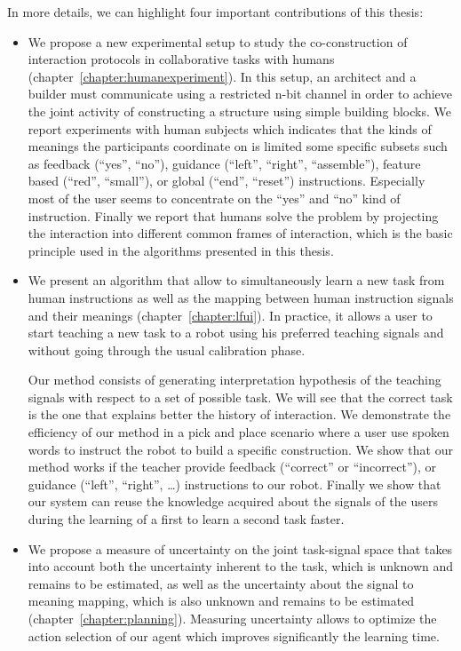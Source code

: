 In more details, we can highlight four important contributions of this thesis:

\begin{itemize}

\item We propose a new experimental setup to study the co-construction of interaction protocols in collaborative tasks with humans \cite{vollmer2014studying} (chapter~\ref{chapter:humanexperiment}). In this setup, an architect and a builder must communicate using a restricted n-bit channel in order to achieve the joint activity of constructing a structure using simple building blocks. We report experiments with human subjects which indicates that the kinds of meanings the participants coordinate on is limited some specific subsets such as feedback (``yes'', ``no''), guidance (``left'', ``right'', ``assemble''), feature based (``red'', ``small''), or global (``end'', ``reset'') instructions. Especially most of the user seems to concentrate on the ``yes'' and ``no'' kind of instruction. Finally we report that humans solve the problem by projecting the interaction into different common frames of
interaction, which is the basic principle used in the algorithms presented in this thesis.

\item  We present an algorithm that allow to simultaneously learn a new task from human instructions as well as the mapping between human instruction signals and their meanings \cite{grizou2013interactive,grizou2013robot,grizou2014robot,grizou2014calibration,grizou2014interactive} (chapter~\ref{chapter:lfui}). In practice, it allows a user to start teaching a new task to a robot using his preferred teaching signals and without going through the usual calibration phase.  

Our method consists of generating interpretation hypothesis of the teaching signals with respect to a set of possible task. We will see that the correct task is the one that explains better the history of interaction. We demonstrate the efficiency of our method in a pick and place scenario where a user use spoken words to instruct the robot to build a specific construction. We show that our method works if the teacher provide feedback (``correct'' or ``incorrect''), or guidance (``left'', ``right'', \ldots) instructions to our robot. Finally we show that our system can reuse the knowledge acquired about the signals of the users during the learning of a first to learn a second task faster.

\item We propose a measure of uncertainty on the joint task-signal space that takes into account both the uncertainty inherent to the task, which is unknown and remains to be estimated, as well as the uncertainty about the signal to meaning mapping, which is also unknown and remains to be estimated \cite{grizou2014calibration,grizou2014interactive} (chapter~\ref{chapter:planning}). Measuring uncertainty allows to optimize the action selection of our agent which improves significantly the learning time.


\end{itemize}
